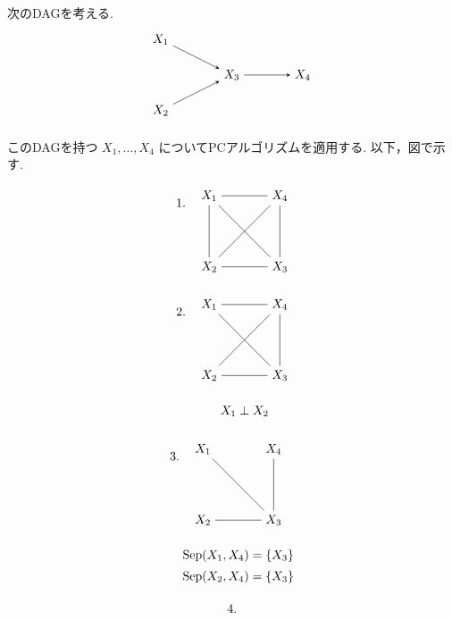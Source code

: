 \documentclass[uplatex, dvipdfmx]{jsarticle}
\begin{document}
\begin{exm}{}
  次のDAGを考える.
  \[
    \begin{tikzpicture}[>=stealth, node distance=1.6cm]
      \node (X1) at (0,1) {$X_1$};
      \node (X2) at (0,-1) {$X_2$};
      \node (X3) at (2,0) {$X_3$};
      \node (X4) at (4,0) {$X_4$};

      \draw[->] (X1) -- (X3);
      \draw[->] (X2) -- (X3);
      \draw[->] (X3) -- (X4);
    \end{tikzpicture}
  \]

  このDAGを持つ $X_1,\ldots,X_4$ についてPCアルゴリズムを適用する.
  以下，図で示す.

  \[
    \begin{tikzpicture}[>=stealth, node distance=1.7cm]
      \node at (-0.8,0.8) {$1.$};

      \node (X1) at (0,1) {$X_1$};
      \node (X2) at (0,-1) {$X_2$};
      \node (X3) at (2,-1) {$X_3$};
      \node (X4) at (2,1) {$X_4$};

      \draw[-] (X1) -- (X2);
      \draw[-] (X1) -- (X3);
      \draw[-] (X1) -- (X4);
      \draw[-] (X2) -- (X3);
      \draw[-] (X2) -- (X4);
      \draw[-] (X3) -- (X4);
    \end{tikzpicture}
  \]

  \[
    \begin{tikzpicture}[>=stealth, node distance=1.7cm]
      \node at (-0.8,0.8) {$2.$};

      \node (X1) at (0,1) {$X_1$};
      \node (X2) at (0,-1) {$X_2$};
      \node (X3) at (2,-1) {$X_3$};
      \node (X4) at (2,1) {$X_4$};

      \draw[-] (X1) -- (X4);
      \draw[-] (X1) -- (X3);
      \draw[-] (X2) -- (X3);
      \draw[-] (X2) -- (X4);
      \draw[-] (X3) -- (X4);

      \node at (1,-2) {$X_1\perp X_2$};
    \end{tikzpicture}
  \]

  \[
    \begin{tikzpicture}[>=stealth, node distance=1.7cm]
      \node at (-0.8,0.8) {$3.$};

      \node (X1) at (0,1) {$X_1$};
      \node (X2) at (0,-1) {$X_2$};
      \node (X3) at (2,-1) {$X_3$};
      \node (X4) at (2,1) {$X_4$};

      \draw[-] (X1) -- (X3);
      \draw[-] (X2) -- (X3);
      \draw[-] (X3) -- (X4);

      \node at (1,-2) {$\mathrm{Sep}(X_1,X_4)=\{X_3\}$};
      \node at (1,-2.6) {$\mathrm{Sep}(X_2,X_4)=\{X_3\}$};
    \end{tikzpicture}
  \]
    \[
    \begin{tikzpicture}[>=stealth, node distance=1.7cm]
      \node at (-0.8,0.8) {$4.$};


\end{tikzpicture}\]
\end{exm}
\end{document}
